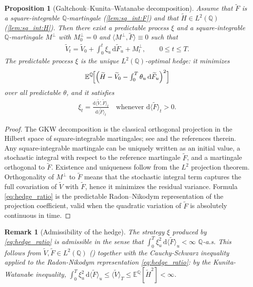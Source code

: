 \documentclass[10pt,a4paper,reqno]{amsart}
\newtheorem{proposition}[theorem]{Proposition}
\newtheorem{remark}[theorem]{Remark}
\newcommand{\E}{\mathbb{E}}
\newcommand{\Q}{\mathbb{Q}}
\newcommand{\1}{\mathbbm{1}}
\newcommand{\dd}{\mathrm{d}}
\begin{document}
\begin{proposition}[Galtchouk--Kunita--Watanabe decomposition]
\label{prop:gkw}
Assume that $\widetilde{F}$ is a square-integrable $\Q$-martingale
(\ref{lem:sq_int:F}) and that
$\widetilde{H} \in L^2(\Q)$ (\ref{lem:sq_int:H}).
Then there exist a predictable process $\xi$ and a square-integrable
$\Q$-martingale $M^{\perp}$ with $M^{\perp}_0=0$ and
$\langle M^{\perp},\widetilde{F}\rangle \equiv 0$ such that
\begin{align}\label{eq:gkw}
  \widetilde{V}_t
  = \widetilde{V}_0
    + \int_0^t \xi_u\,\dd \widetilde{F}_u
    + M^{\perp}_t,
  \qquad 0 \le t \le T.
\end{align}
The predictable process $\xi$ is the unique $L^2(\Q)$-optimal hedge:
it minimizes
$$
\E^{\Q}\!\Bigl[
  \Bigl(\widetilde{H}
  - \widetilde{V}_0
  - \textstyle\int_0^T \theta_u\,\dd\widetilde{F}_u\Bigr)^2
\Bigr]
$$
over all predictable $\theta$, and it satisfies
\begin{align}\label{eq:hedge_ratio}
  \xi_t
  = \frac{\dd \langle \widetilde{V},\widetilde{F}\rangle_t}
         {\dd \langle \widetilde{F}\rangle_t}
  \quad \text{whenever } \dd \langle \widetilde{F}\rangle_t > 0.
\end{align}
\end{proposition}

\begin{proof}
The GKW decomposition is the classical orthogonal projection in the Hilbert
space of square-integrable martingales; see \citet{Sch01} and the references
therein. Any square-integrable martingale can be uniquely written as an
initial value, a stochastic integral with respect to the reference martingale
$\widetilde{F}$, and a martingale orthogonal to $\widetilde{F}$. Existence
and uniqueness follow from the $L^2$ projection theorem.
Orthogonality of $M^{\perp}$ to $\widetilde{F}$ means that
the stochastic integral term captures the full covariation of $\widetilde{V}$
with $\widetilde{F}$, hence it minimizes the residual variance. Formula
\eqref{eq:hedge_ratio} is the predictable Radon--Nikodym representation of the
projection coefficient, valid when the quadratic variation of $\widetilde{F}$
is absolutely continuous in time.
\end{proof}

\begin{remark}[Admissibility of the hedge]
\label{rem:admissibility}
The strategy $\xi$ produced by \eqref{eq:hedge_ratio} is admissible in the
sense that
$\int_0^T \xi_u^2\,\dd\langle\widetilde{F}\rangle_u < \infty$ $\Q$-a.s.
This follows from $\widetilde{V},\widetilde{F} \in L^2(\Q)$
() together with the Cauchy-Schwarz inequality applied to
the Radon-Nikodym representation \eqref{eq:hedge_ratio}: by the
Kunita-Watanabe inequality,
$\int_0^T \xi_u^2\,\dd\langle\widetilde{F}\rangle_u
\le \langle\widetilde{V}\rangle_T \le \E^\Q[\widetilde{H}^2] < \infty$.
\end{remark}
\end{document}

